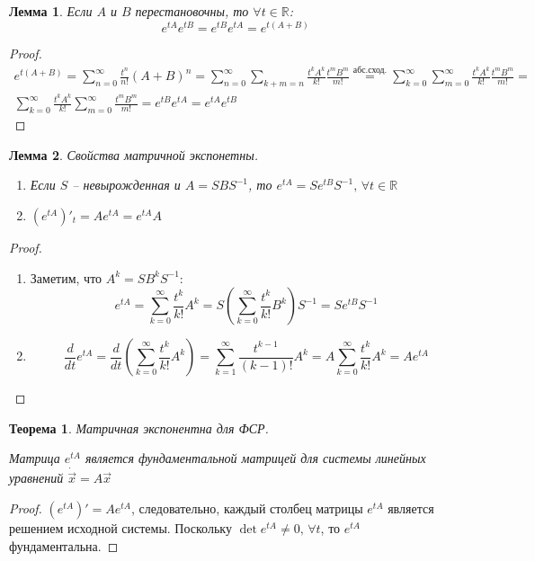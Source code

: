 \documentclass[a4paper,12pt]{article}
\theoremstyle{plain}
\newtheorem{theorem}{Теорема}[section]
\newtheorem{lemma}{Лемма}[section]
\theoremstyle{definition}
\theoremstyle{remark}
\begin{document}
\begin{lemma}
	Если $A$ и $B$ перестановочны, то $\forall t \in \mathbb{R}$:
	\[e^{tA}e^{tB} = e^{tB}e^{tA} = e^{t(A + B)}\]
\end{lemma}
\begin{proof}
	\begin{align*}
		e^{t(A + B)} = \sum_{n = 0}^\infty \frac{t^n}{n!}(A + B)^n = \sum_{n = 0}^\infty \sum_{k + m = n} \frac{t^kA^k}{k!}\frac{t^mB^m}{m!} \overset{\text{абс.сход.}}{=} \sum_{k = 0}^\infty\sum_{m=0}^\infty \frac{t^kA^k}{k!}\frac{t^mB^m}{m!} = \\ \sum_{k = 0}^\infty\frac{t^kA^k}{k!}\sum_{m=0}^\infty\frac{t^mB^m}{m!} = e^{tB}e^{tA} = e^{tA}e^{tB}
	\end{align*}
\end{proof}

\begin{lemma}
	Свойства матричной экспонетны.

	\begin{enumerate}
		\item Если $S$ -- невырожденная и $A = SBS^{-1}$, то $e^{tA} = Se^{tB}S^{-1},\, \forall t \in \mathbb{R}$
		\item $(e^{tA})'_t = Ae^{tA} = e^{tA}A$
	\end{enumerate}
\end{lemma}
\begin{proof}
	\begin{enumerate}
		\item Заметим, что $A^k = SB^kS^{-1}$:
		      \[e^{tA} = \sum_{k=0}^\infty\frac{t^k}{k!}A^k = S \left(\sum_{k = 0}^\infty \frac{t^k}{k!}B^k\right)S^{-1} = Se^{tB}S^{-1}\]
		\item
		      \[\frac{d}{dt}e^{tA} = \frac{d}{dt}\left(\sum_{k=0}^\infty\frac{t^k}{k!}A^k\right) = \sum_{k = 1}^\infty \frac{t^{k-1}}{(k-1)!}A^k = A \sum_{k=0}^\infty\frac{t^k}{k!}A^k = Ae^{tA}\]
	\end{enumerate}
\end{proof}

\begin{theorem}
	Матричная экспонентна для ФСР.

	Матрица $e^{tA}$ является фундаментальной матрицей для системы линейных уравнений $\dot{\vec{x}} = A\vec{x}$
\end{theorem}

\begin{proof}
	$(e^{tA})' = Ae^{tA}$, следовательно, каждый столбец матрицы $e^{tA}$ является решением исходной системы. Поскольку $\det e^{tA} \neq 0,\, \forall t$, то $e^{tA}$ фундаментальна.
\end{proof}
\end{document}
